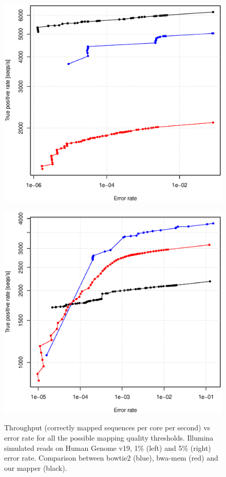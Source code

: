 \begin{figure}[h]
	\begin{minipage}[b]{0.5\linewidth}
	  \centering
	  \includegraphics[width=\textwidth]{figures/chap4_hg_1_15_throughput}
	  \label{fig:chap4:hg115}
   \end{minipage}
	\begin{minipage}[b]{0.5\linewidth}
	  \centering
	  \includegraphics[width=\textwidth]{figures/chap4_hg_5_15_throughput}
	  \label{fig:chap4:hg215}
   \end{minipage}
   \caption{Throughput (correctly mapped sequences per core per
       second) vs error rate for all the possible mapping quality
       thresholds. Illumina simulated reads on Human Genome v19, 1\%
       (left) and 5\% (right) error rate. Comparison between bowtie2
       (blue), bwa-mem (red) and our mapper (black). }
\end{figure}

